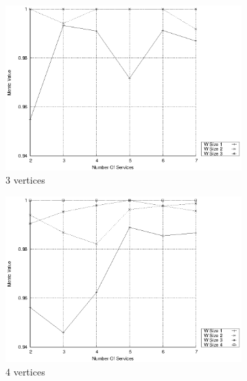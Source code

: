 \begin{figure}[h]
  \centering
  \begin{subfigure}{0.33\textwidth}
    \includegraphics[width=\textwidth]{Images/graphs/window_quality_performance_diff_qual_n7_s7_20_100_n3}
    \caption{3 vertices}
    \label{fig:quality_window_wide_qualitative_n3}
  \end{subfigure}
  \hfill
  \begin{subfigure}{0.33\textwidth}
    \includegraphics[width=\textwidth]{Images/graphs/window_quality_performance_diff_qual_n7_s7_20_100_n4}
    \caption{4 vertices}
    \label{fig:quality_window_wide_qualitative_n4}
  \end{subfigure}
  \hfill
  \begin{subfigure}{0.33\textwidth}

\end{subfigure}
\end{figure}
